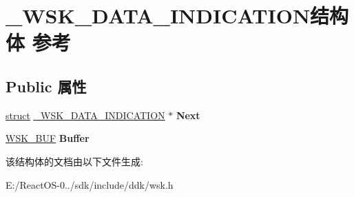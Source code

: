 \hypertarget{struct___w_s_k___d_a_t_a___i_n_d_i_c_a_t_i_o_n}{}\section{\+\_\+\+W\+S\+K\+\_\+\+D\+A\+T\+A\+\_\+\+I\+N\+D\+I\+C\+A\+T\+I\+O\+N结构体 参考}
\label{struct___w_s_k___d_a_t_a___i_n_d_i_c_a_t_i_o_n}
\subsection*{Public 属性}
\begin{DoxyCompactItemize}
\item 
\mbox{\label{struct___w_s_k___d_a_t_a___i_n_d_i_c_a_t_i_o_n_a896fc637002c29858a7207e71f70215d}} 
\hyperlink{interfacestruct}{struct} \hyperlink{struct___w_s_k___d_a_t_a___i_n_d_i_c_a_t_i_o_n}{\+\_\+\+W\+S\+K\+\_\+\+D\+A\+T\+A\+\_\+\+I\+N\+D\+I\+C\+A\+T\+I\+ON} $\ast$ {\bfseries Next}
\item 
\mbox{\label{struct___w_s_k___d_a_t_a___i_n_d_i_c_a_t_i_o_n_aeb10b4381ecdd08fad7ed338454b218d}} 
\hyperlink{struct___w_s_k___b_u_f}{W\+S\+K\+\_\+\+B\+UF} {\bfseries Buffer}
\end{DoxyCompactItemize}


该结构体的文档由以下文件生成\+:\begin{DoxyCompactItemize}
\item 
E\+:/\+React\+O\+S-\/0../sdk/include/ddk/wsk.\+h\end{DoxyCompactItemize}
